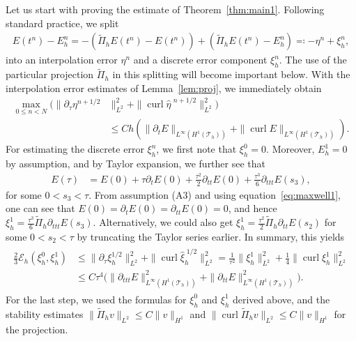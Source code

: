 \documentclass[12pt,reqno,a4paper]{amsart}
\theoremstyle{definition}
\def\Th{\mathcal{T}_h}
\def\EE{\mathscr{E}}
\def\dtau{\partial_{\tau}}
\def\dt{\partial_{t}}
\def\dtt{\partial_{tt}}
\def\dttt{\partial_{ttt}}
\def\curl{\operatorname{curl}}
\def\wPi{\widetilde\Pi}
\def\Th{\mathcal{T}_h}
\def\wt{\widetilde}
\begin{document}
Let us start with proving the estimate of Theorem~\ref{thm:main1}. 
Following standard practice, we split
\begin{align}\label{eq:spliterror}
E(t^n)-E_h^n = -(\wPi_h E(t^n)-E(t^n)) + (\wPi_h E(t^n)-E_h^n)\eqqcolon -\eta^n+\xi_h^n,
\end{align}
into an interpolation error $\eta^n$ and a discrete error component $\xi_h^n$.
The use of the particular projection $\wPi_h$ in this splitting will become important below. 
With the interpolation error estimates of Lemma~\ref{lem:proj}, we immediately obtain
\begin{align*}
\max\limits_{0\le n< N}\Big(\|\dtau \eta^{n+1/2}&\|_{L^2}^2 + \|\curl\widehat \eta^{\,\,n+1/2}\|_{L^2}^2\Big) \\
&\le C h\left(\|\dt E\|_{L^\infty(H^1(\Th))} + \|\curl E\|_{L^\infty(H^1(\Th))}\right).
\end{align*}
For estimating the discrete error  $\xi_h^n$, we first note that $\xi_h^0=0$.
Moreover, $E_h^1=0$ by assumption, and by Taylor expansion, we further see that
\begin{align*}
E(\tau) &= E(0) + \tau \dt E(0) + \tfrac{\tau^2}{2} \dtt E(0) + \tfrac{\tau^3}{6} \dttt E(s_3),
\end{align*}
for some $0 < s_3 < \tau$.
From assumption (A3) and using equation~\eqref{eq:maxwell1}, one can see that $E(0)=\dt E(0)=\dtt E(0)=0$, and hence 
$\xi_h^1 = \frac{\tau^3}{6} \wt \Pi_h \dttt E(s_3)$.
Alternatively, we could also get $\xi_h^1=\frac{\tau^2}{2} \wt \Pi_h \dtt E(s_2)$ for some $0 < s_2 < \tau$ by truncating the Taylor series earlier.
In summary, this yields 
\begin{align}\label{eq:initvalest}
\begin{split}
\tfrac23\EE_h(\xi_h^0,\xi_h^{1}) &\le \|\dtau \xi_h^{1/2}\|_{L^2}^2 + \|\curl\widehat \xi_h^{\;1/2}\|_{L^2}^2 
= \tfrac1{\tau^2}\|\xi_h^1\|_{L^2}^2 + \tfrac14\|\curl\xi_h^1\|_{L^2}^2\\
&\le C \tau^4 \Big(\|\dttt E\|_{L^\infty(H^1(\Th))}^2+ \|\dtt E\|_{L^\infty(H^1(\Th))}^2\Big).
\end{split}
\end{align}
For the last step, we used the formulas for $\xi_h^0$ and $\xi_h^1$ derived above, and the stability estimates $\|\wt \Pi_h v\|_{L^2} \le C \|v\|_{H^1}$ and $\|\curl \wt \Pi_h v\|_{L^2} \le C \|v\|_{H^1}$ for the projection. 
\end{document}
